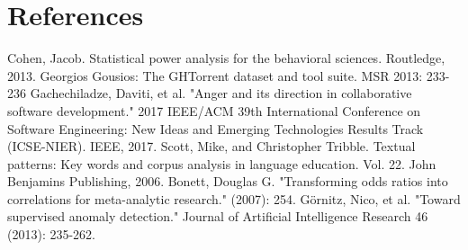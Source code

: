 \documentclass[conference]{IEEEtran}
\begin{document}
\section{References}


\begin{thebibliography}{00}
 Cohen, Jacob. Statistical power analysis for the behavioral sciences. Routledge, 2013.
 Georgios Gousios: The GHTorrent dataset and tool suite. MSR 2013: 233-236
 Gachechiladze, Daviti, et al. "Anger and its direction in collaborative software development." 2017 IEEE/ACM 39th International Conference on Software Engineering: New Ideas and Emerging Technologies Results Track (ICSE-NIER). IEEE, 2017.
 Scott, Mike, and Christopher Tribble. Textual patterns: Key words and corpus analysis in language education. Vol. 22. John Benjamins Publishing, 2006.
 Bonett, Douglas G. "Transforming odds ratios into correlations for meta-analytic research." (2007): 254.
 Görnitz, Nico, et al. "Toward supervised anomaly detection." Journal of Artificial Intelligence Research 46 (2013): 235-262.



\end{thebibliography}
\end{document}
